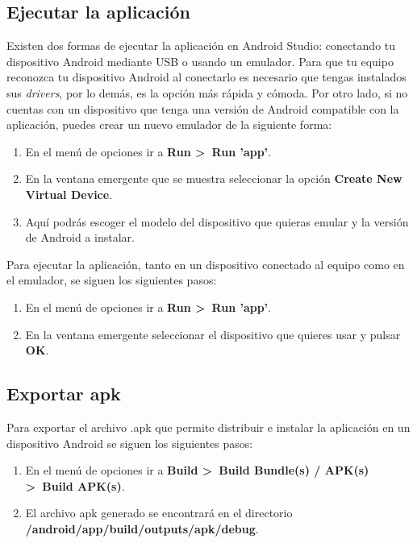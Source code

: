 \subsection{Ejecutar la aplicación}

Existen dos formas de ejecutar la aplicación en Android Studio: conectando tu dispositivo Android mediante USB o usando un emulador. Para que tu equipo reconozca tu dispositivo Android al conectarlo es necesario que tengas instalados sus \textit{drivers}, por lo demás, es la opción más rápida y cómoda. Por otro lado, si no cuentas con un dispositivo que tenga una versión de Android compatible con la aplicación, puedes crear un nuevo emulador de la siguiente forma: 

\begin{enumerate}
	\item En el menú de opciones ir a \textbf{Run >~Run 'app'}. 
	\item En la ventana emergente que se muestra seleccionar la opción \textbf{Create New Virtual Device}. 
	\item Aquí podrás escoger el modelo del dispositivo que quieras emular y la versión de Android a instalar. 
\end{enumerate}

Para ejecutar la aplicación, tanto en un dispositivo conectado al equipo como en el emulador, se siguen los siguientes pasos: 

\begin{enumerate}
	\item En el menú de opciones ir a \textbf{Run >~Run 'app'}.
	\item En la ventana emergente seleccionar el dispositivo que quieres usar y pulsar \textbf{OK}. 
\end{enumerate}

\subsection{Exportar apk}

Para exportar el archivo .apk que permite distribuir e instalar la aplicación en un dispositivo Android se siguen los siguientes pasos: 

\begin{enumerate}
	\item En el menú de opciones ir a \textbf{Build >~Build Bundle(s) / APK(s) >~Build APK(s)}. 
	\item El archivo apk generado se encontrará en el directorio \\ \textbf{/android/app/build/outputs/apk/debug}.
\end{enumerate}

